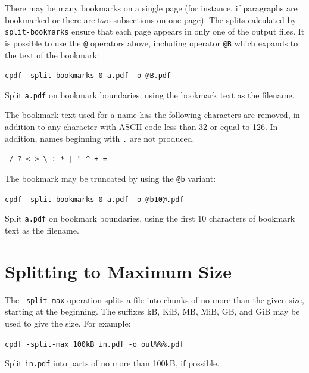 \documentclass{book}
\begin{document}
\noindent There may be many bookmarks on a single page (for instance, if
paragraphs are bookmarked or there are two subsections on one page). The splits
calculated by \texttt{-split-bookmarks} ensure that each page appears in only
one of the output files.
  It is possible to use the \texttt{@} operators above, including operator \texttt{@B} which expands to the text of the bookmark:

  \begin{framed}\small
    \noindent\verb!cpdf -split-bookmarks 0 a.pdf -o @B.pdf!

    \vspace{2.5mm}
    \noindent Split \texttt{a.pdf} on bookmark boundaries, using the bookmark text as the filename.

  \end{framed}

\noindent The bookmark text used for a name has the following characters are removed, in addition to any character with ASCII code less than 32 or equal to 126. In addition, names beginning with \texttt{.} are not produced.

  \begin{framed}
  \centering
  \verb! / ? < > \ : * | " ^ + =!
  \end{framed}

\noindent The bookmark may be truncated by using the \texttt{@b} variant:

  \begin{framed}\small
    \noindent\verb!cpdf -split-bookmarks 0 a.pdf -o @b10@.pdf!

    \vspace{2.5mm}
    \noindent Split \texttt{a.pdf} on bookmark boundaries, using the first 10 characters of bookmark text as the filename.

  \end{framed}

\section{Splitting to Maximum Size}

The \texttt{-split-max} operation splits a file into chunks of no more than the given size, starting at the beginning. The suffixes kB, KiB, MB, MiB, GB, and GiB may be used to give the size. For example:

  \begin{framed}\small
    \noindent\verb!cpdf -split-max 100kB in.pdf -o out%%%.pdf!

    \vspace{2.5mm}
    \noindent Split \texttt{in.pdf} into parts of no more than 100kB, if possible.

  \end{framed}
\end{document}
